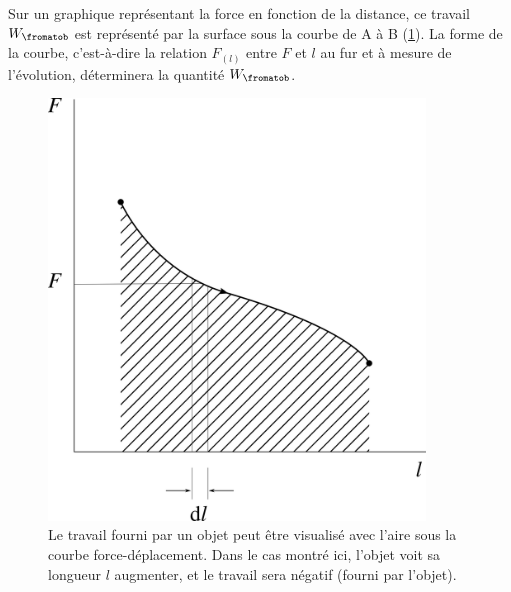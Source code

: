 	Sur un graphique représentant la force en fonction de la distance, ce travail $W_\fromatob$ est représenté par la surface sous la courbe de A à B (\cref{fig_force-déplacement-aire}). La forme de la courbe, c’est-à-dire la relation $F_{(l)}$ entre $F$ et $l$ au fur et à mesure de l’évolution, déterminera la quantité $W_\fromatob$.
	
	\begin{figure}
	\begin{center}
		\includegraphics[width=10cm]{images/fl.png}
	\end{center}
	\caption{Le travail fourni par un objet peut être visualisé avec l’aire sous la courbe force-déplacement. Dans le cas montré ici, l’objet voit sa longueur $l$ augmenter, et le travail sera négatif (fourni par l’objet).}
	\label{fig_force-déplacement-aire}
	\end{figure}

